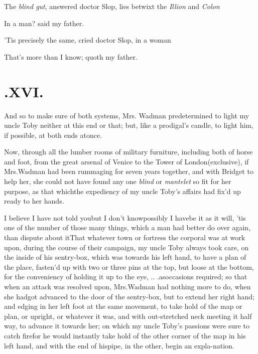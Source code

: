 \documentclass{article}
\begin{document}
\newpage
The \textit{blind gut}, answered doctor Slop, lies betwixt the
\textit{Illion} and \textit{Colon}\tsh

\tsh In a man? said my father.

\tsh ’Tis precisely the same, cried
doctor Slop, in a woman\tsh

That’s more than I know; quoth my father.

\newpage
\section{.\enspace XVI.}

\quad
\tsh And so to make sure of both systems, Mrs.
Wadman predetermined to light my uncle Toby neither
at this end or that; but, like a prodigal’s candle, to light
him, if possible, at both ends at\break once.

Now, through all the lumber rooms of military furniture,
including both of horse and foot, from the great arsenal\break 
of Venice to the Tower of London\break (exclusive), if
Mrs.\@ Wadman had been rummaging for seven years together, and
with Bridget to help her, she could not have found any one
\textit{blind} or \textit{man\-telet} so fit for her purpose, as that
which\pb the expediency of my uncle Toby’s affairs had
fix’d up ready to her hands.

I believe I have not told you\tsh but I don’t know\tsh possibly I have\tsh be it
as it will, ’tis one of the number of those many things, which a man had better do
over again, than dispute about it\tsk That whatever town or fortress the corporal was
at work upon, during the course of their campaign, my uncle Toby always took care,
on the inside of his sentry-box, which was towards his left hand, to have a plan of
the place, fasten’d up with two or three pins at the top, but loose at the bottom,
for the conveniency of holding it up to the eye, \etc .\@ .\@
.\@ as\break occasions required;
so that when an attack was resolved upon, Mrs.\@ Wadman had nothing more to do, when
she had\pb got advanced to the door of the sentry-box, but to extend her right hand;
and edging in her left foot at the same movement, to take hold of the map or plan,
or upright, or whatever it was, and with out-stretched neck meeting it half way, \tsk 
to advance it towards her; on which my uncle Toby’s passions
were sure to catch fire\tsh for he would instantly take hold of
the other corner of the map in his left hand, and with the end
of his\break pipe, in the other, begin an expla-\break nation.
\end{document}
